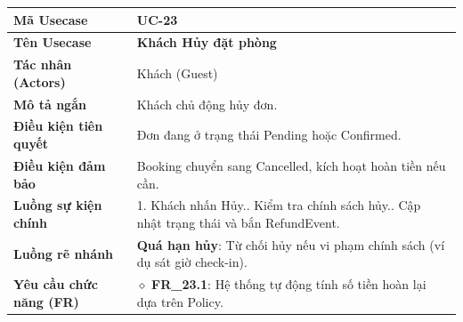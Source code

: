 \begin{table}[H]
\renewcommand{\arraystretch}{1.3}
\centering
\begin{tabularx}{\textwidth}{|p{4.5cm}|X|}
\hline
\cellcolor{gray!15}\bfseries Mã Usecase & \textbf{UC-23} \\ \hline
\cellcolor{gray!15}\bfseries Tên Usecase & \textbf{Khách Hủy đặt phòng} \\ \hline
\cellcolor{gray!15}\bfseries Tác nhân (Actors) & Khách (Guest) \\ \hline
\cellcolor{gray!15}\bfseries Mô tả ngắn & Khách chủ động hủy đơn. \\ \hline
\cellcolor{gray!15}\bfseries Điều kiện tiên quyết & Đơn đang ở trạng thái Pending hoặc Confirmed. \\ \hline
\cellcolor{gray!15}\bfseries Điều kiện đảm bảo & Booking chuyển sang Cancelled, kích hoạt hoàn tiền nếu cần. \\ \hline
\cellcolor{gray!15}\bfseries Luồng sự kiện chính & 1. Khách nhấn Hủy.\newline 2. Kiểm tra chính sách hủy.\newline 3. Cập nhật trạng thái và bắn RefundEvent. \\ \hline
\cellcolor{gray!15}\bfseries Luồng rẽ nhánh & \textbf{Quá hạn hủy}: Từ chối hủy nếu vi phạm chính sách (ví dụ sát giờ check-in). \\ \hline
\cellcolor{gray!15}\bfseries Yêu cầu chức năng (FR) & $\diamond$ \textbf{FR\_23.1}: Hệ thống tự động tính số tiền hoàn lại dựa trên Policy. \\ \hline
\end{tabularx}
\end{table}

